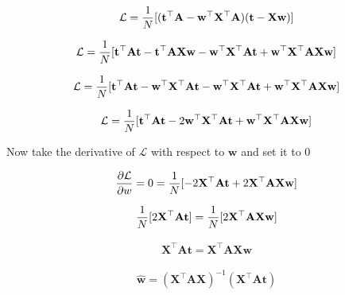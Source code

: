 \documentclass[10pt]{article}
\begin{document}
\begin{itemize}
\begin{eqnarray*}
\mathcal{L} = {1 \over N} [ (\mathbf{t}^\top \mathbf{A} -  \mathbf{w}^\top \mathbf{X}^\top \mathbf{A}) (\mathbf{t} - \mathbf{X} \mathbf{w}) ]
\end{eqnarray*}


\begin{eqnarray*}
\mathcal{L} = {1 \over N} [ \mathbf{t}^\top \mathbf{A} \mathbf{t}  - \mathbf{t}^\top \mathbf{A} \mathbf{X} \mathbf{w} - \mathbf{w}^\top \mathbf{X}^\top \mathbf{A} \mathbf{t} + \mathbf{w}^\top \mathbf{X}^\top \mathbf{A} \mathbf{X} \mathbf{w} ]
\end{eqnarray*}


\begin{eqnarray*}
\mathcal{L} = {1 \over N} [ \mathbf{t}^\top \mathbf{A} \mathbf{t}  - \mathbf{w}^\top \mathbf{X}^\top \mathbf{A} \mathbf{t} - \mathbf{w}^\top \mathbf{X}^\top \mathbf{A} \mathbf{t} + \mathbf{w}^\top \mathbf{X}^\top \mathbf{A} \mathbf{X} \mathbf{w} ]
\end{eqnarray*}

\begin{eqnarray*}
\mathcal{L} = {1 \over N} [ \mathbf{t}^\top \mathbf{A} \mathbf{t} -2 \mathbf{w}^\top \mathbf{X}^\top \mathbf{A} \mathbf{t} + \mathbf{w}^\top \mathbf{X}^\top \mathbf{A} \mathbf{X} \mathbf{w} ]
\end{eqnarray*}



Now take the derivative of $\mathcal{L}$ with respect to $\mathbf{w}$ and set it to 0

\begin{eqnarray*}
\frac{\partial \mathcal{L} } {\partial w} = 0 = {1 \over N} [-2 \mathbf{X}^\top \mathbf{A} \mathbf{t} + 2 \mathbf{X}^\top \mathbf{A} \mathbf{X} \mathbf{w} ] 
\end{eqnarray*}

\begin{eqnarray*}
 {1 \over N} [2 \mathbf{X}^\top \mathbf{A} \mathbf{t} ] = {1 \over N}[ 2 \mathbf{X}^\top \mathbf{A} \mathbf{X} \mathbf{w} ] 
\end{eqnarray*}

\begin{eqnarray*}
 \mathbf{X}^\top \mathbf{A} \mathbf{t} = \mathbf{X}^\top \mathbf{A} \mathbf{X} \mathbf{w}
\end{eqnarray*}

\begin{eqnarray*}
 \mathbf{\hat{w}} = (\mathbf{X}^\top \mathbf{A} \mathbf{X})^{-1} (\mathbf{X}^\top \mathbf{A} \mathbf{t})
\end{eqnarray*}


\end{itemize}
\end{document}
